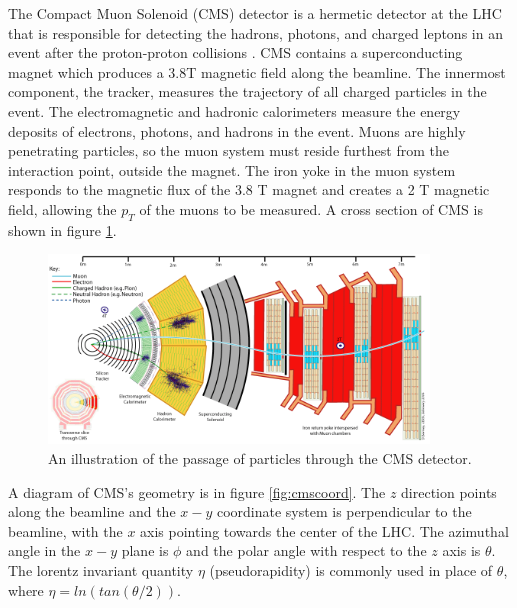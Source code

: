 \documentclass[oneside, letterpaper, oldfontcommands]{memoir}
\begin{document}
\qquad The Compact Muon Solenoid (CMS) detector is a hermetic detector at the LHC that is responsible for detecting the hadrons, photons, and charged leptons in an event after the proton-proton collisions \cite{1748-0221-3-08-S08001}. CMS contains a superconducting magnet which produces a 3.8T magnetic field along the beamline. The innermost component, the tracker, measures the trajectory of all charged particles in the event. The electromagnetic and hadronic calorimeters measure the energy deposits of electrons, photons, and hadrons in the event. Muons are highly penetrating particles, so the muon system must reside furthest from the interaction point, outside the magnet. The iron yoke in the muon system responds to the magnetic flux of the 3.8 T magnet and creates a 2 T magnetic field, allowing the $p_{T}$ of the muons to be measured. A cross section of CMS is shown in figure \ref{fig:cmsxsec}. 

\begin{figure}[here]
\includegraphics[width=0.9\textwidth]{CMS_SLICE.png}
\caption{An illustration of the passage of particles through the CMS detector. \cite{CMS_SLICE}}
\label{fig:cmsxsec}
\end{figure}

\qquad A diagram of CMS's geometry is in figure \ref{fig:cmscoord}. The $z$ direction points along the beamline and the $x-y$ coordinate system is perpendicular to the beamline, with the $x$ axis pointing towards the center of the LHC. The azimuthal angle in the $x-y$ plane is $\phi$ and the polar angle with respect to the $z$ axis is $\theta$. The lorentz invariant quantity $\eta$ (pseudorapidity) is commonly used in place of $\theta$, where $\eta = ln(tan(\theta/2))$.
\end{document}
